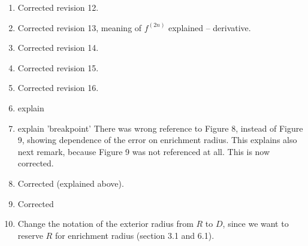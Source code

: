\documentclass[a4paper,11pt]{article}
\begin{document}
\begin{enumerate}
\item Corrected revision 12. %
\item Corrected revision 13, meaning of $f^{(2n)}$ explained -- derivative. %
\item Corrected revision 14. %
\item Corrected revision 15. %
\item Corrected revision 16. %

\item explain%

\item explain 'breakpoint'
      There was wrong reference to Figure 8, instead of Figure 9, showing dependence of the error on enrichment radius. %
      This explains also next remark, because Figure 9 was not referenced at all.
      This is now corrected. %
\item Corrected (explained above). %
\item Corrected %
\item Change the notation of the exterior radius from $R$ to $D$, since we want to reserve $R$ for enrichment radius (section 3.1 and 6.1).

\end{enumerate} 
\end{document}
